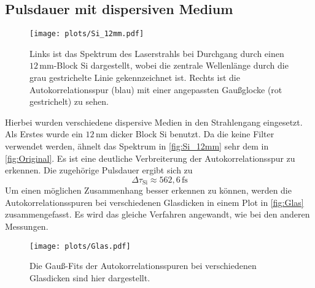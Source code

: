 \subsection{Pulsdauer mit dispersiven Medium}
    \begin{figure}[H]
        \centering\captionsetup{format=plain}\vspace*{-0.5cm}
        \texttt{[image: plots/Si\_12mm.pdf]} \vspace*{-0.5cm}
        \caption{Links ist das Spektrum des Laserstrahls bei Durchgang durch einen $12\,\si{\milli\meter}$-Block Si dargestellt, wobei die zentrale Wellenlänge durch die grau gestrichelte Linie gekennzeichnet ist. Rechts ist die Autokorrelationsspur (blau) mit einer angepassten Gaußglocke (rot gestrichelt) zu sehen.}
        \label{fig:Si_12mm}
    \end{figure}
    \FloatBarrier
    Hierbei wurden verschiedene dispersive Medien in den Strahlengang eingesetzt.
    Als Erstes wurde ein $12\,\si{\nano\meter}$ dicker Block Si benutzt.
    Da die keine Filter verwendet werden, ähnelt das Spektrum in \autoref{fig:Si_12mm} sehr dem in \autoref{fig:Original}.
    Es ist eine deutliche Verbreiterung der Autokorrelationsspur zu erkennen.
    Die zugehörige Pulsdauer ergibt sich zu
    \begin{equation*}
        \Delta \tau_{\mathrm{Si}} \approx 562,6\,\si{\femto\second}
    \end{equation*}
    Um einen möglichen Zusammenhang besser erkennen zu können, werden die Autokorrelationsspuren bei verschiedenen Glasdicken in einem Plot in \autoref{fig:Glas} zusammengefasst.
    Es wird das gleiche Verfahren angewandt, wie bei den anderen Messungen.
    \begin{figure}[t]
        \centering\captionsetup{format=plain}
        \texttt{[image: plots/Glas.pdf]} \vspace*{-0.5cm}
        \caption{Die Gauß-Fits der Autokorrelationsspuren bei verschiedenen Glasdicken sind hier dargestellt.}
        \label{fig:Glas}
    \end{figure}
    \FloatBarrier

